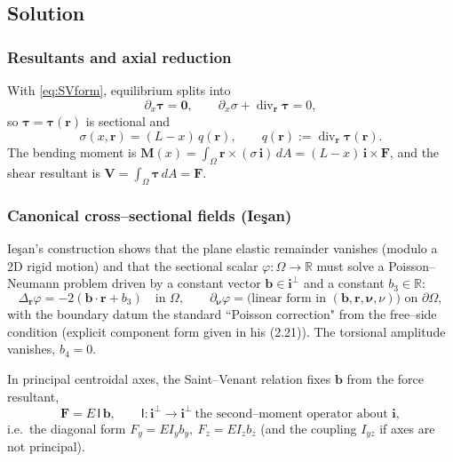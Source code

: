 \subsection*{Solution}

\subsubsection*{Resultants and axial reduction}
With \eqref{eq:SVform}, equilibrium splits into
\[
\partial_x\bm{\tau}=\mathbf{0},\qquad
\partial_x\sigma+\operatorname{div}_{\!\bm{r}}\bm{\tau}=0,
\]
so $\bm{\tau}=\bm{\tau}(\bm{r})$ is sectional and
\begin{equation}
\sigma(x,\bm{r})=(L-x)\,q(\bm{r}),\qquad
q(\bm{r}):=\operatorname{div}_{\!\bm{r}}\bm{\tau}(\bm{r}).
\label{eq:sigmaq}
\end{equation}
The bending moment is $\bm{M}(x)=\displaystyle\int_\Omega \bm{r}\times(\sigma\,\mathbf{i})\,dA=(L-x)\,\mathbf{i}\times\bm{F}$, and the shear resultant is $\bm{V}=\displaystyle\int_\Omega\bm{\tau}\,dA=\bm{F}$.

\subsubsection*{Canonical cross–sectional fields (Ieşan)}
Ieşan’s construction shows that the plane elastic remainder vanishes (modulo a 2D rigid motion) and that the sectional scalar $\varphi:\Omega\to\mathbb{R}$ must solve a Poisson–Neumann problem driven by a constant vector $\bm{b}\in\mathbf{i}^\perp$ and a constant $b_3\in\mathbb{R}$:
\begin{equation}
\Delta_{\!\bm{r}}\varphi=-2(\bm{b}\cdot\bm{r}+b_3)\quad\text{in }\Omega,
\qquad
\partial_{\bm{\nu}}\varphi=\text{(linear form in $(\bm{b},\bm{r},\bm{\nu},\nu)$) on }\partial\Omega,
\label{eq:phiBVP}
\end{equation}
with the boundary datum the standard ``Poisson correction" from the free–side condition (explicit component form given in his (2.21)). The torsional amplitude vanishes, $b_4=0$. 

In principal centroidal axes, the Saint–Venant relation fixes $\bm{b}$ from the force resultant,
\begin{equation}
\bm{F}=E\,\bm{\mathsf{I}}\,\bm{b},\qquad
\bm{\mathsf{I}}:\mathbf{i}^\perp\!\to\!\mathbf{i}^\perp\ \text{the second–moment operator about }\mathbf{i},
\label{eq:SV-FI}
\end{equation}
i.e.\ the diagonal form $F_y=E I_y b_y,\ F_z=E I_z b_z$ (and the coupling $I_{yz}$ if axes are not principal).

